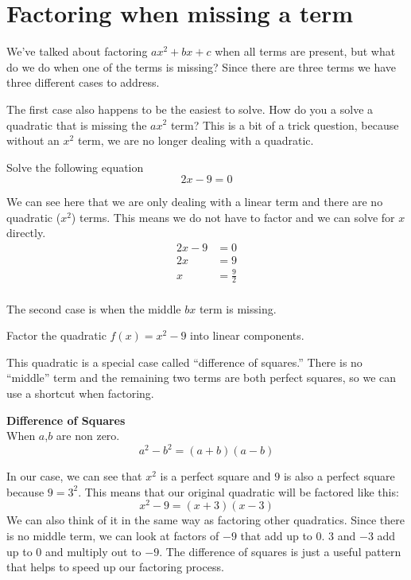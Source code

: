 \documentclass{ximera}
\begin{document}
\section{Factoring when missing a term}
We've talked about factoring $ax^2+bx+c$ when all terms are present, but what do we do when one of the terms is missing? Since there are three terms we have three different cases to address.

The first case also happens to be the easiest to solve. How do you a solve a quadratic that is missing the $ax^2$ term? This is a bit of a trick question, because without an $x^2$ term, we are no longer dealing with a quadratic. 
\begin{example}
Solve the following equation
\[
2x-9=0
\]

\begin{explanation}
We can see here that we are only dealing with a linear term and there are no quadratic ($x^2$) terms. This means we do not have to factor and we can solve for $x$ directly.
\begin{align*}
2x-9&=0\\
2x&=9\\
x&=\frac{9}{2}\\
\end{align*}
\end{explanation}
\end{example}
The second case is when the middle $bx$ term is missing. 
\begin{example}
Factor the quadratic $f(x)=x^2-9$ into linear components.\\

\begin{explanation}
This quadratic is a special case called ``difference of squares.'' There is no ``middle'' term and the remaining two terms are both perfect squares, so we can use a shortcut when factoring.
\begin{callout}
\textbf{Difference of Squares}\\
When $a$,$b$ are non zero.
\[
a^2-b^2=(a+b)(a-b)
\]
\end{callout}
In our case, we can see that $x^2$ is a perfect square and $9$ is also a perfect square because $9=3^2$. This means that our original quadratic will be factored like this:
\[
x^2-9=(x+3)(x-3)
\]
We can also think of it in the same way as factoring other quadratics. Since there is no middle term, we can look at factors of $-9$ that add up to $0$. $3$ and $-3$ add up to $0$ and multiply out to $-9$. The difference of squares is just a useful pattern that helps to speed up our factoring process.
\end{explanation}
\end{example}
\end{document}
